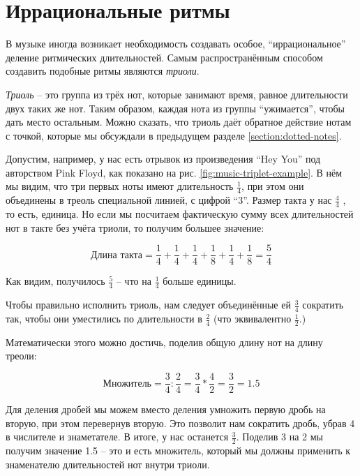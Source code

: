 \documentclass[../sparc.tex]{subfiles}
\begin{document}
\section{Иррациональные ритмы}

В музыке иногда возникает необходимость создавать особое, ``иррациональное''
деление ритмических длительностей.  Самым распространённым способом создавить
подобные ритмы являются \emph{триоли}.

\emph{Триоль} -- это группа из трёх нот, которые занимают время, равное
длительности двух таких же нот.  Таким образом, каждая нота из группы
``ужимается'', чтобы дать место остальным.  Можно сказать, что триоль даёт
обратное действие нотам с точкой, которые мы обсуждали в предыдущем разделе
\ref{section:dotted-notes}.


Допустим, например, у нас есть отрывок из произведения ``Hey You'' под
авторством Pink Floyd, как показано на рис. \ref{fig:music-triplet-example}.  В
нём мы видим, что три первых ноты имеют длительность $\frac{1}{4}$, при этом они
объединены в треоль специальной линией, с цифрой ``3''.  Размер такта у нас
$\frac{4}{4}$ , то есть, единица.  Но если мы посчитаем фактическую сумму всех
длительностей нот в такте без учёта триоли, то получим большее значение:

\begin{equation}
  \mbox{Длина такта} = \frac{1}{4} + \frac{1}{4}
  + \frac{1}{4} + \frac{1}{8} + \frac{1}{4} + \frac{1}{8} = \frac{5}{4}
\end{equation}

Как видим, получилось $\frac{5}{4}$ -- что на $\frac{1}{4}$ больше единицы.

Чтобы правильно исполнить триоль, нам следует объединённые ей $\frac{3}{4}$
сократить так, чтобы они уместились по длительности в $\frac{2}{4}$ (что
эквивалентно $\frac{1}{2}$.)

Математически этого можно достичь, поделив общую длину нот на длину треоли:

\begin{equation}
  \mbox{Множитель} = \frac{3}{4} : \frac{2}{4} = \frac{3}{4} * \frac{4}{2}
  = \frac{3}{2} = 1.5
\end{equation}

Для деления дробей мы можем вместо деления умножить первую дробь на вторую, при
этом перевернув вторую.  Это позволит нам сократить дробь, убрав 4 в числителе и
знаметателе.  В итоге, у нас останется $\frac{3}{2}$.  Поделив 3 на 2 мы получим
значение 1.5 -- это и есть множитель, который мы должны применить к знаменателю
длительностей нот внутри триоли.
\end{document}
